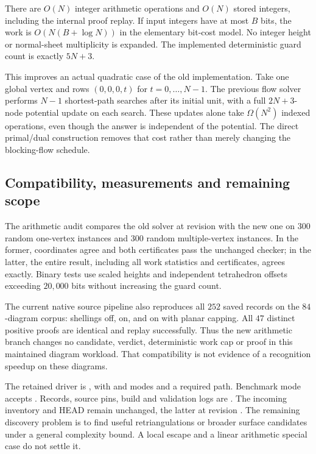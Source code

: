There are $O(N)$ integer arithmetic operations and $O(N)$ stored integers,
including the internal proof replay. If input integers have at most $B$ bits,
the work is $O(N(B+\log N))$ in the elementary bit-cost model. No integer
height or normal-sheet multiplicity is expanded. The implemented deterministic
guard count is exactly $5N+3$.

This improves an actual quadratic case of the old implementation. Take one
global vertex and rows $(0,0,0,t)$ for $t=0,\ldots,N-1$. The previous flow
solver performs $N-1$ shortest-path searches after its initial unit, with a
full $2N+3$-node potential update on each search. These updates alone take
$\Omega(N^2)$ indexed operations, even though the answer is independent of
the potential. The direct primal/dual construction removes that cost rather
than merely changing the blocking-flow schedule.

\subsection{Compatibility, measurements and remaining scope}

The arithmetic audit compares the old solver at revision 
with the new one on $300$ random one-vertex instances and $300$ random
multiple-vertex instances. In the former, coordinates agree and both
certificates pass the unchanged checker; in the latter, the entire result,
including all work statistics and certificates, agrees exactly. Binary
tests use scaled heights and independent tetrahedron offsets exceeding
$20{,}000$ bits without increasing the guard count.

The current native source pipeline also reproduces all $252$ saved records
on the $84$-diagram corpus: shellings off, on, and on with planar capping.
All $47$ distinct positive proofs are identical and replay successfully.
Thus the new arithmetic branch changes no candidate, verdict, deterministic
work cap or proof in this maintained diagram workload. That compatibility
is not evidence of a recognition speedup on these diagrams.


The retained driver is
, with  and
 modes and a required  path. Benchmark mode
accepts . Records, source pins, build and validation logs are
. The incoming inventory and 
HEAD remain unchanged, the latter at revision .
The remaining discovery problem is to find useful retriangulations or broader
surface candidates under a general complexity bound. A local escape and a
linear arithmetic special case do not settle it.
